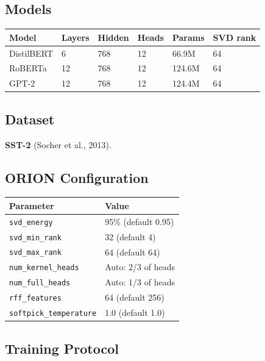 \subsection{Models}

\begin{table}[H]
\centering
\small
\begin{tabular}{llllll}
\toprule
\textbf{Model} & \textbf{Layers} & \textbf{Hidden} & \textbf{Heads} & \textbf{Params} & \textbf{SVD rank} \\
\midrule
DistilBERT & 6 & 768 & 12 & 66.9M & 64 \\
RoBERTa & 12 & 768 & 12 & 124.6M & 64 \\
GPT-2 & 12 & 768 & 12 & 124.4M & 64 \\
\bottomrule
\end{tabular}
\end{table}

\subsection{Dataset}

\textbf{SST-2} (Socher et al., 2013).

\subsection{ORION Configuration}

\begin{table}[H]
\centering
\small
\begin{tabular}{ll}
\toprule
\textbf{Parameter} & \textbf{Value} \\
\midrule
\texttt{svd\_energy} & 95\% (default 0.95) \\
\texttt{svd\_min\_rank} & 32 (default 4) \\
\texttt{svd\_max\_rank} & 64 (default 64) \\
\texttt{num\_kernel\_heads} & Auto: 2/3 of heads \\
\texttt{num\_full\_heads} & Auto: 1/3 of heads \\
\texttt{rff\_features} & 64 (default 256) \\
\texttt{softpick\_temperature} & 1.0 (default 1.0) \\
\bottomrule
\end{tabular}
\end{table}

\subsection{Training Protocol}

